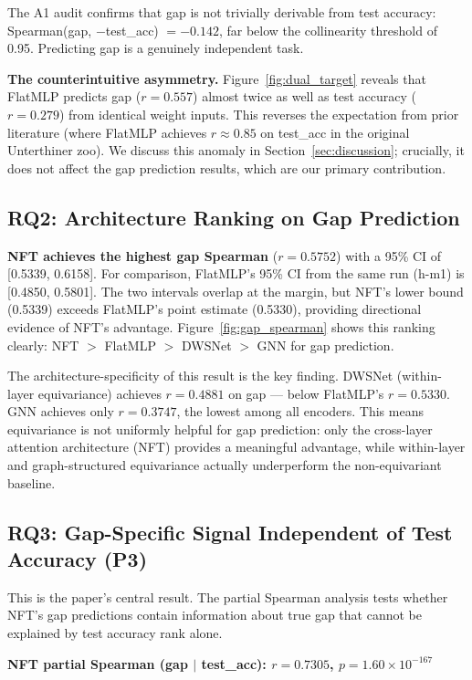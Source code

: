 The A1 audit confirms that gap is not trivially derivable from test accuracy: Spearman(gap, $-$test\_acc)
$= -0.142$, far below the collinearity threshold of 0.95. Predicting gap is a genuinely independent task.

\textbf{The counterintuitive asymmetry.} Figure~\ref{fig:dual_target} reveals that FlatMLP
predicts gap ($r = 0.557$) almost twice as well as test accuracy ($r = 0.279$) from identical weight inputs.
This reverses the expectation from prior literature (where FlatMLP achieves $r \approx 0.85$ on test\_acc in the
original Unterthiner zoo). We discuss this anomaly in Section~\ref{sec:discussion}; crucially, it does not affect the
gap prediction results, which are our primary contribution.

\subsection{RQ2: Architecture Ranking on Gap Prediction}

\textbf{NFT achieves the highest gap Spearman} ($r = 0.5752$) with a 95\% CI of [0.5339, 0.6158]. For
comparison, FlatMLP's 95\% CI from the same run (h-m1) is [0.4850, 0.5801]. The two intervals overlap
at the margin, but NFT's lower bound (0.5339) exceeds FlatMLP's point estimate (0.5330), providing
directional evidence of NFT's advantage. Figure~\ref{fig:gap_spearman} shows this ranking clearly: NFT $>$ FlatMLP $>$
DWSNet $>$ GNN for gap prediction.

The architecture-specificity of this result is the key finding. DWSNet (within-layer equivariance)
achieves $r = 0.4881$ on gap --- below FlatMLP's $r = 0.5330$. GNN achieves only $r = 0.3747$, the lowest
among all encoders. This means equivariance is not uniformly helpful for gap prediction: only the
cross-layer attention architecture (NFT) provides a meaningful advantage, while within-layer and
graph-structured equivariance actually underperform the non-equivariant baseline.

\subsection{RQ3: Gap-Specific Signal Independent of Test Accuracy (P3)}

This is the paper's central result. The partial Spearman analysis tests whether NFT's gap predictions
contain information about true gap that cannot be explained by test accuracy rank alone.

\textbf{NFT partial Spearman (gap $|$ test\_acc): $r = 0.7305$, $p = 1.60 \times 10^{-167}$}

